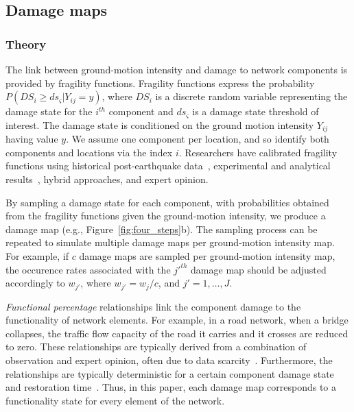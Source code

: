 

\subsection{Damage maps}
\subsubsection{Theory}
The link between ground-motion intensity and damage to network components is provided by fragility functions. Fragility functions express the probability $P(DS_i \geq ds_{\varsigma} | Y_{ij} = y)$, where $DS_i$ is a discrete random variable representing the damage state for the $i^{th}$ component and $ds_{\varsigma}$ is a damage state threshold of interest. The damage state is conditioned on the ground motion intensity $Y_{ij}$ having value $y$. We assume one component per location, and so identify both components and locations via the index $i$. Researchers have calibrated fragility functions using historical post-earthquake data~\cite[e.g.,][]{basoz_enhancement_1999}, experimental and analytical results~\cite[e.g.,][]{ramanathan_next_2012}, hybrid approaches, and expert opinion. %

By sampling a damage state for each component, with probabilities obtained from the fragility functions given the ground-motion intensity, we produce a damage map (e.g., Figure~\ref{fig:four_steps}{b}). The sampling process can be repeated to simulate multiple damage maps per ground-motion intensity map. For example, if $c$ damage maps are sampled per ground-motion intensity map, the occurence rates associated with the $j'^{th}$ damage map should be adjusted accordingly to $w_{j'}$, where $w_{j'} = {w_j}/{c}$, and $j' = 1, \ldots, J$. 

\emph{Functional percentage} relationships link the component damage to the functionality of network elements.  For example, in a road network, when a bridge collapses, the traffic flow capacity of the road it carries and it crosses are reduced to zero. These relationships are typically derived from a combination of observation and expert opinion, often due to data scarcity~\cite{werner_redars_2006}. Furthermore, the relationships are typically deterministic for a certain component damage state and restoration time~\cite{werner_redars_2006}. Thus, in this paper, each damage map corresponds to a functionality state for every element of the network.

